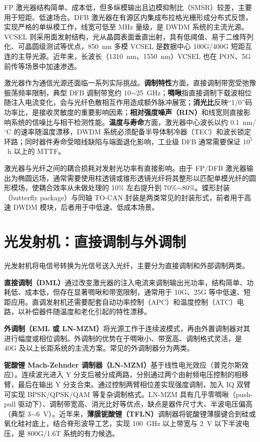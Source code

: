 \documentclass[a4paper,11pt,UTF8,fontset=fandol]{ctexart}
\begin{document}
FP 激光器结构简单、成本低，但多纵模输出且边模抑制比（SMSR）较差，主要用于短距、低速场合。DFB 激光器在有源区内集成布拉格光栅形成分布式反馈，实现严格的单纵模工作，线宽可低至 MHz 量级，是 DWDM 系统的主流光源。VCSEL 则采用面发射结构，光从晶圆表面垂直出射，具有低阈值、易于二维阵列化、可晶圆级测试等优点，850~nm 多模 VCSEL 是数据中心 100G/400G 短距互连的主导光源。近年来，长波长（1310~nm、1550~nm）VCSEL 也在 PON、5G 前传等场景中加速渗透。

激光器作为通信光源还面临一系列实际挑战。\textbf{调制特性}方面，直接调制带宽受弛豫振荡频率限制，典型 DFB 调制带宽约 10$\sim$25~GHz；\textbf{啁啾}指直接调制下载波相位随注入电流变化，会与光纤色散相互作用造成额外脉冲展宽；\textbf{消光比}反映“1/0”码功率比，是接收灵敏度的重要影响因素；\textbf{相对强度噪声（RIN）}和线宽则直接影响系统的信噪比与相干检测性能。\textbf{温度与寿命}方面，激光器中心波长以约 0.1~nm/$^{\circ}$C 的速率随温度漂移，DWDM 系统必须配备半导体制冷器（TEC）和波长锁定环路；同时器件寿命受暗线缺陷与端面退化影响，工业级 DFB 通常需要保证 $10^5$~h 以上的 MTTF。

激光器与光纤之间的耦合损耗对发射光功率有直接影响。由于 FP/DFB 激光器输出为椭圆远场，通常需要使用柱透镜或锥形透镜光纤将其整形以匹配单模光纤的圆形模场，使耦合效率从未做处理的 10\% 左右提升到 70\%$\sim$80\%。蝶形封装（butterfly package）与同轴 TO-CAN 封装是两类常见的封装形式，前者用于高速 DWDM 模块，后者用于中低速、低成本场景。

\section{光发射机：直接调制与外调制}

光发射机将电信号转换为光信号送入光纤，主要分为直接调制和外部调制两类\cite{yuanrong2020,wang2018tfln}。

\textbf{直接调制（DML）}通过改变激光器的注入电流来调制输出光功率，结构简单、功耗低、成本低，但存在显著啁啾和带宽限制，通常用于 10G、25G 等中低速、短距应用。直调发射机还需要配套自动功率控制（APC）和温度控制（ATC）电路，以补偿器件随温度和老化引起的特性漂移。

\textbf{外调制（EML 或 LN-MZM）}将光源工作于连续波模式，再由外置调制器对其进行幅度或相位调制。外调制的优势在于啁啾小、带宽高、调制格式灵活，是 40G 及以上长距系统的主流方案。常见的外调制器分为两类。

\textbf{铌酸锂 Mach-Zehnder 调制器（LN-MZM）}基于线性电光效应（普克尔斯效应）。连续波光进入 Y 分支后被分成两路，分别通过两个由射频电压控制的相移臂，最后在输出 Y 分支合束。通过控制两臂相位差实现强度调制，加入 IQ 双臂可实现 BPSK/QPSK/QAM 等复杂调制格式。LN-MZM 具有几乎零啁啾（push-pull 驱动下）、调制带宽高、消光比好等优点，缺点是器件尺寸大、半波电压偏高（典型 3$\sim$6~V）。近年来，\textbf{薄膜铌酸锂（TFLN）}调制器将铌酸锂薄膜键合到硅或氧化硅衬底上，结合脊形波导工艺，实现 100~GHz 以上带宽与 2~V 以下半波电压，是 800G/1.6T 系统的有力候选\cite{wang2018tfln}。
\end{document}
